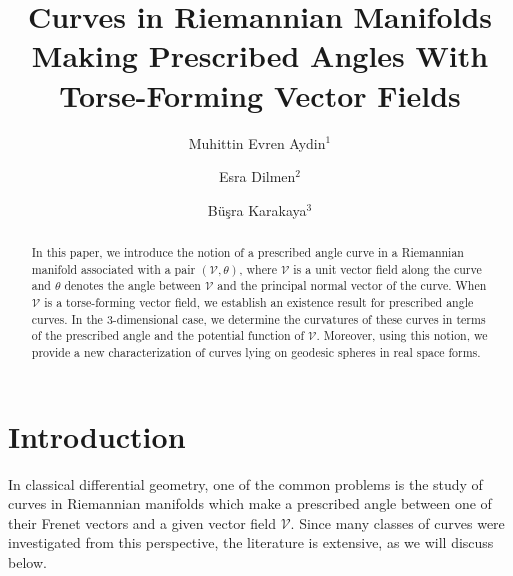 \documentclass[12pt]{amsart}
\def\v{\mathcal V}
\theoremstyle{definition}
\begin{document}
\title[Curves in Riemannian manifolds]{Curves in Riemannian Manifolds Making Prescribed Angles With Torse-Forming Vector Fields}


\author{Muhittin Evren Aydin$^1$}
\address{$^1$Department of Mathematics, Faculty of Science, Firat University, Elazığ,  23200 Türkiye
\newline
ORCID: 0000-0001-9337-8165}
\author{ Esra Dilmen$^2$}
 \address{$^2$Firat University, Graduate School of Natural and Applied Sciences, Mathematics,
Elazığ, Türkiye
\newline
ORCID: 0000-0001-6750-9475}

\author{ Büşra Karakaya$^3$}
 \address{$^3$Firat University, Graduate School of Natural and Applied Sciences, Mathematics,
Elazığ, Türkiye
 \newline
ORCID: 0009-0000-6285-3701}



\begin{abstract}
In this paper, we introduce the notion of a prescribed angle curve in a Riemannian manifold associated with a pair $(\mathcal{V},\theta)$, where $\mathcal{V}$ is a unit vector field along the curve and $\theta$ denotes the angle between $\mathcal{V}$ and the principal normal vector of the curve. When $\mathcal{V}$ is a torse-forming vector field, we establish an existence result for prescribed angle curves. In the $3$-dimensional case, we determine the curvatures of these curves in terms of the prescribed angle and the potential function of $\mathcal{V}$. Moreover, using this notion, we provide a new characterization of curves lying on geodesic spheres in real space forms.
\end{abstract}
\maketitle





\section{Introduction} \label{intro}

In classical differential geometry, one of the common problems is the study of curves in Riemannian manifolds which make a prescribed angle between one of their Frenet vectors and a given vector field $\v$. Since many classes of curves were investigated from this perspective, the literature is extensive, as we will discuss below.
\end{document}
